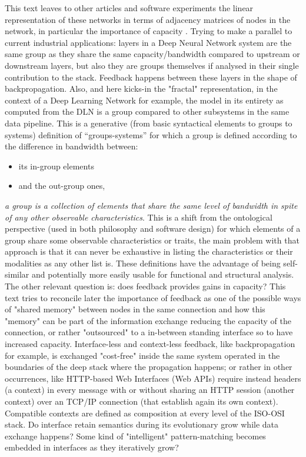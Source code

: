 \documentclass[14pt,a4paper]{extarticle}
\begin{document}
\hspace*{15mm}This text leaves to other articles and software experiments the linear representation of these networks in terms of adjacency matrices of nodes in the network, in particular the importance of capacity \cite{QuantaFlow}. Trying to make a parallel to current industrial applications: layers in a Deep Neural Network system are the same group as they share the same capacity/bandwidth compared to upstream or downstream layers, but also they are groups themselves if analysed in their single contribution to the stack. Feedback happens between these layers in the shape of backpropagation. Also, and here kicks-in the "fractal" representation, in the context of a Deep Learning Network for example, the model in its entirety as computed from the DLN is a group compared to other subsystems in the same data pipeline.
\newline
\hspace*{15mm}This is a generative (from basic syntactical elements to groups to systems) definition of “groups-systems” for which a group is defined according to the difference in bandwidth between:
\begin{itemize}
\item its in-group elements
\item and the out-group ones,
\end{itemize} 
\textit{a group is a collection of elements that share the same level of bandwidth in spite of any other observable characteristics}.
This is a shift from the ontological perspective (used in both philosophy and software design) for which elements of a group share some observable characteristics or traits, the main problem with that approach is that it can never be exhaustive in listing the characteristics or their modalities as any other list is. These definitions have the advantage of being self-similar and potentially more easily usable for functional and structural analysis. The other relevant question is: does feedback provides gains in capacity? This text tries to reconcile later the importance of feedback as one of the possible ways of "shared memory" between nodes in the same connection and how this "memory" can be part of the information exchange reducing the capacity of the connection, or rather "outsourced" to a in-between standing interface so to have increased capacity. Interface-less and context-less feedback, like backpropagation for example, is exchanged "cost-free" inside the same system operated in the boundaries of the deep stack where the propagation happens; or rather in other occurrences, like HTTP-based Web Interfaces (Web APIs) require instead headers (a context) in every message with or without sharing an HTTP session (another context) over an TCP/IP connection (that establish again its own context). Compatible contexts are defined as composition at every level of the ISO-OSI stack. 
Do interface retain semantics during its evolutionary grow while data exchange happens? Some kind of "intelligent" pattern-matching becomes embedded in interfaces as they iteratively grow?
\end{document}
